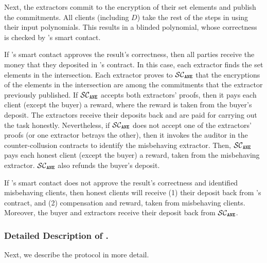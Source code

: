 %
Next, the extractors commit to the encryption of their set elements and publish the commitments. 
%
All clients (including $D$) take the rest of the steps in \fpsi using their input polynomials. This results in a blinded polynomial,  whose correctness is checked by \fpsi's smart contact. 

If  \fpsi's smart contact approves the result's correctness, then all parties receive the money that they deposited in \fpsi's contract. In this case, each extractor finds the set elements in the intersection. Each extractor proves to $\mathcal{SC}_{\mathtt{ANE}}$ that the encryptions of the elements in the intersection are among the commitments that the extractor previously published. 
%
If $\mathcal{SC}_{\mathtt{ANE}}$ accepts both extractors' proofs, then it pays each client (except the buyer) a reward, where the reward is taken from the buyer's deposit. The extractors receive their deposits back and are paid for carrying out the task honestly. Nevertheless, if $\mathcal{SC}_{\mathtt{ANE}}$ does not accept one of the extractors' proofs (or one extractor betrays the other), then it invokes the auditor in the counter-collusion contracts to identify the misbehaving extractor.  Then, $\mathcal{SC}_{\mathtt{ANE}}$ pays each honest client (except the buyer) a reward, taken from the misbehaving extractor. $\mathcal{SC}_{\mathtt{ANE}}$ also refunds the buyer's deposit.
%

If  \fpsi's smart contact does not approve the result's correctness and \aud identified misbehaving clients, then honest clients will receive (1) their deposit back from \fpsi's contract, and (2)  compensation and reward, taken from misbehaving clients. Moreover, the buyer and extractors receive their deposit back from $\mathcal{SC}_{\mathtt{ANE}}$.












\subsubsection{Detailed Description of \epsi.} Next, we describe the protocol in more detail. 



